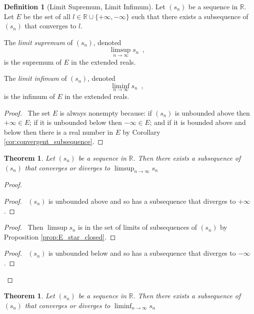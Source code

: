 \documentclass{book}
\let\qed\relax
\newtheorem{thm}[prop]{Theorem}
\theoremstyle{definition}
\newtheorem{df}[prop]{Definition}
\begin{document}
\begin{df}[Limit Supremum, Limit Infimum]
Let $(s_n)$ be a sequence in $\mathbb{R}$. Let $E$ be the set of all $l \in \mathbb{R} \cup \{ + \infty, - \infty \}$ such that there exists a subsequence of $(s_n)$ that converges to $l$.

The \emph{limit supremum} of $(s_n)$, denoted
\[ \limsup_{n \rightarrow \infty} s_n \enspace , \]
is the supremum of $E$ in the extended reals.

The \emph{limit infimum} of $(s_n)$, denoted
\[ \liminf_{n \rightarrow \infty} s_n \enspace , \]
is the infimum of $E$ in the extended reals.
\end{df}

\begin{proof}
\pf\ The set $E$ is always nonempty because: if $(s_n)$ is unbounded above then $+ \infty \in E$; if it is unbounded below then $- \infty \in E$; and if it is bounded above and below then there is a real number in $E$ by Corollary \ref{cor:convergent_subsequence}. \qed
\end{proof}

\begin{thm}
Let $(s_n)$ be a sequence in $\mathbb{R}$. Then there exists a subsequence of $(s_n)$ that converges or diverges to $\limsup_{n \rightarrow \infty} s_n$
\end{thm}

\begin{proof}
\pf
{}
\begin{proof}
	\pf\ $(s_n)$ is unbounded above and so has a subsequence that diverges to $+ \infty$.
\end{proof}
\begin{proof}
	\pf\ Then $\limsup s_n$ is in the set of limits of subsequences of $(s_n)$ by Proposition \ref{prop:E_star_closed}.
\end{proof}
\begin{proof}
	\pf\ $(s_n)$ is unbounded below and so has a subsequence that diverges to $- \infty$.
\end{proof}
\qed
\end{proof}

\begin{thm}
Let $(s_n)$ be a sequence in $\mathbb{R}$. Then there exists a subsequence of $(s_n)$ that converges or diverges to $\liminf_{n \rightarrow \infty} s_n$
\end{thm}
\end{document}

